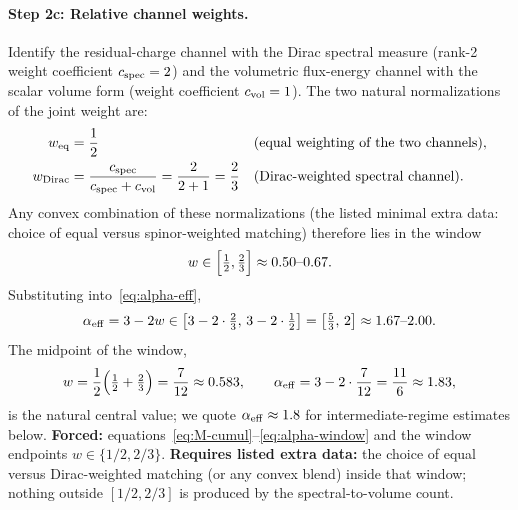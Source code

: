 \documentclass[11pt,a4paper]{article}
\begin{document}
\paragraph{Step 2c: Relative channel weights.}
Identify the residual-charge channel with the Dirac spectral measure (rank-2 weight coefficient \(c_{\rm spec}=2\)) and the volumetric flux-energy channel with the scalar volume form (weight coefficient \(c_{\rm vol}=1\)). The two natural normalizations of the joint weight are:
\begin{align}
w_{\rm eq}&=\frac12
&&\text{(equal weighting of the two channels)},
\label{eq:w-eq}\\
w_{\rm Dirac}&=\frac{c_{\rm spec}}{c_{\rm spec}+c_{\rm vol}}=\frac{2}{2+1}=\frac23
&&\text{(Dirac-weighted spectral channel)}.
\label{eq:w-Dirac}
\end{align}
Any convex combination of these normalizations (the listed minimal extra data: choice of equal versus spinor-weighted matching) therefore lies in the window
\begin{equation}
w\in\Bigl[\tfrac12,\tfrac23\Bigr]\approx 0.50\text{--}0.67.
\label{eq:w-window}
\end{equation}
Substituting into~\eqref{eq:alpha-eff},
\begin{equation}
\alpha_{\rm eff}=3-2w\in\bigl[3-2\cdot\tfrac23,\,3-2\cdot\tfrac12\bigr]=\bigl[\tfrac53,\,2\bigr]\approx 1.67\text{--}2.00.
\label{eq:alpha-window}
\end{equation}
The midpoint of the window,
\begin{equation}
w=\frac12\Bigl(\tfrac12+\tfrac23\Bigr)=\frac{7}{12}\approx 0.583,
\qquad
\alpha_{\rm eff}=3-2\cdot\frac{7}{12}=\frac{11}{6}\approx 1.83,
\label{eq:alpha-central}
\end{equation}
is the natural central value; we quote \(\alpha_{\rm eff}\approx 1.8\) for intermediate-regime estimates below. \textbf{Forced:} equations~\eqref{eq:M-cumul}--\eqref{eq:alpha-window} and the window endpoints \(w\in\{1/2,2/3\}\). \textbf{Requires listed extra data:} the choice of equal versus Dirac-weighted matching (or any convex blend) inside that window; nothing outside \([1/2,2/3]\) is produced by the spectral-to-volume count.
\end{document}
